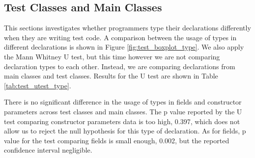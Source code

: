 \documentclass[preprint]{sigplanconf}
\begin{document}
% 
% 
% 

\subsection{Test Classes and Main Classes\label{res-test-scripts}}
This sections investigates whether programmers type their declarations differently when they are writing test code.
A comparison between the usage of types in different declarations is shown in Figure \ref{fig:test_boxplot_type}. 
We also apply the Mann Whitney U test, but this time however we are not comparing declaration types to each other.
Instead, we are comparing declarations from main classes and test classes.
Results for the U test are shown in Table \ref{tab:test_utest_type}.

There is no significant difference in the usage of types in fields and constructor parameters across test classes and main classes.
The p value reported by the U test comparing constructor parameters data is too high, 0.397, which does not allow us to reject the null hypothesis for this type of declaration.
As for fields, p value for the test comparing fields is small enough, 0.002, but the reported confidence interval negligible.
\end{document}
